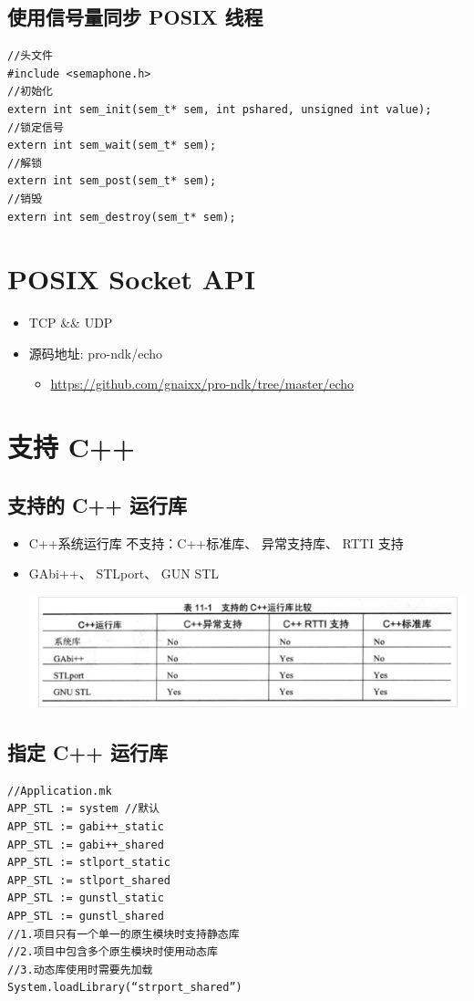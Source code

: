 \documentclass[9pt, b5paper]{article}
\begin{document}
\subsection{使用信号量同步 POSIX 线程}
\label{sec-4-3}
\begin{verbatim}
//头文件
#include <semaphone.h>
//初始化
extern int sem_init(sem_t* sem, int pshared, unsigned int value);
//锁定信号
extern int sem_wait(sem_t* sem);
//解锁
extern int sem_post(sem_t* sem);
//销毁
extern int sem_destroy(sem_t* sem);
\end{verbatim}

\section{POSIX Socket API}
\label{sec-5}
\begin{itemize}
\item TCP \&\& UDP
\item 源码地址: pro-ndk/echo
\begin{itemize}
\item \url{https://github.com/gnaixx/pro-ndk/tree/master/echo}
\end{itemize}
\end{itemize}

\section{支持 C++}
\label{sec-6}
\subsection{支持的 C++ 运行库}
\label{sec-6-1}
\begin{itemize}
\item C++系统运行库 不支持：C++标准库、 异常支持库、 RTTI 支持
\item GAbi++、 STLport、 GUN STL

\includegraphics[width=.9\linewidth]{./pic/stl.png}
\end{itemize}
\subsection{指定 C++ 运行库}
\label{sec-6-2}
\begin{verbatim}
//Application.mk
APP_STL := system //默认
APP_STL := gabi++_static
APP_STL := gabi++_shared
APP_STL := stlport_static
APP_STL := stlport_shared
APP_STL := gunstl_static
APP_STL := gunstl_shared
//1.项目只有一个单一的原生模块时支持静态库
//2.项目中包含多个原生模块时使用动态库
//3.动态库使用时需要先加载 
System.loadLibrary(“strport_shared”)
\end{verbatim}
\end{document}
